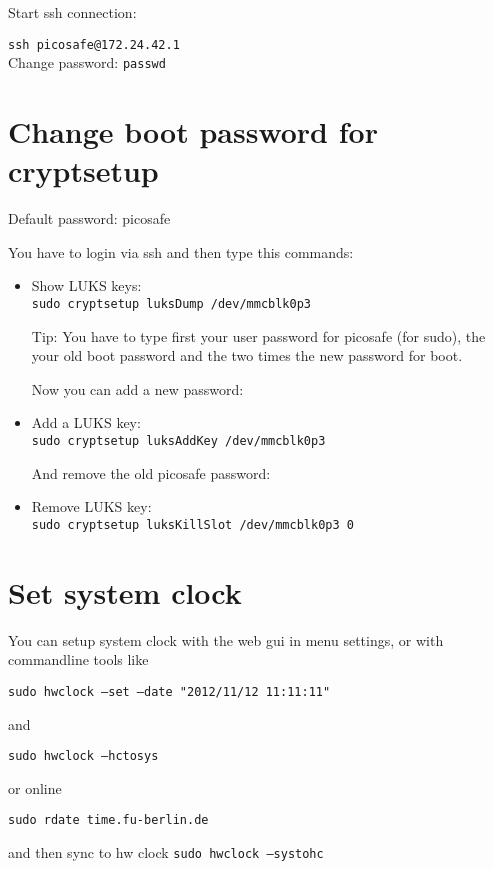 Start ssh connection:

\texttt{ssh picosafe@172.24.42.1} \\

Change password:
\texttt{passwd} \\


\section{Change boot password for cryptsetup}

Default password: picosafe

You have to login via ssh and then type this commands:

\begin{itemize}

\item Show LUKS keys: \\
\texttt{sudo cryptsetup luksDump /dev/mmcblk0p3}

Tip: You have to type first your user password for picosafe (for sudo),
the your old boot password and the two times the new password for boot.


Now you can add a new password:


\item Add a LUKS key: \\
\texttt{sudo cryptsetup luksAddKey /dev/mmcblk0p3}


And remove the old picosafe password:

\item Remove LUKS key: \\
\texttt{sudo cryptsetup luksKillSlot /dev/mmcblk0p3 0}

\end{itemize}

\section{Set system clock}

You can setup system clock with the web gui in menu settings, 
or with commandline tools like

\texttt{sudo hwclock --set --date "2012/11/12 11:11:11"}

and

\texttt{sudo hwclock --hctosys}

or online 

\texttt{sudo rdate time.fu-berlin.de}

and then sync to hw clock
\texttt{sudo hwclock --systohc}

